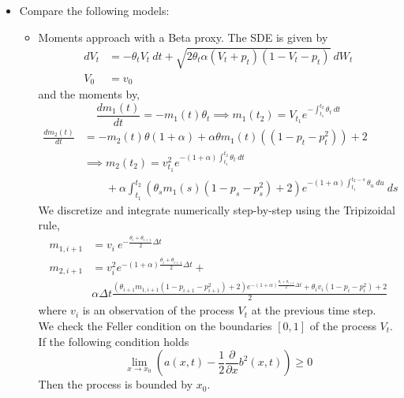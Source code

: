 \documentclass[a4paper, 12pt]{article}
\begin{document}
\begin{itemize}
\item Compare the following models:
	\begin{itemize}
		\item Moments approach with a Beta proxy. The SDE is given by
		\begin{equation}
		\begin{split}
		dV_t &=  - \theta_t V_t \  dt + \sqrt{2 \theta_t \alpha (V_t +p_t ) (1-V_t-p_t)} \  dW_t  \\ %
		V_0 & = v_0
	\end{split}\label{VtSDE}
	\end{equation}
		and the moments by,
		\begin{equation*}
		\frac{d m_1 (t)}{dt} = - m_1(t)\theta_t \implies m_1(t_2)= V_{t_1} e^{-\int_{t_1}^{t_2} \theta_t \ dt }
		\end{equation*}
		\begin{equation*}
		\begin{split}
		\frac{d m_2 (t)}{dt} &=  - m_2(t)\theta(1+\alpha) + \alpha\theta m_1(t)( (1-p_t -p_t^2)) +2 \\
		& \implies m_2(t_2) = v_{t_1}^2 e^{-(1+\alpha)\int_{t_1}^{t_2} \theta_t \ dt} \\
		& \quad \quad + \alpha \int_{t_1}^{t_2} \left(\theta_s m_1(s)( 1-p_s - p_s^2 )+2\right)   e^{-(1+\alpha)\int_{t_1}^{t_2-s} \theta_u \ du}  \ ds
		\end{split}
		\end{equation*}
		We discretize and integrate numerically step-by-step using the Tripizoidal rule,
		\begin{align*}
			m_{1,i+1}&= v_i \ e^{ - \frac{\theta_i + \theta_{i+1}}{2} \Delta t} \\
			m_{2,i+1} &= v_i^2 e^{-(1+ \alpha)\frac{\theta_i + \theta_{i+1}}{2} \Delta t } + \\
			& \alpha \Delta t  \frac{ \left( \theta_{i+1}m_{1,i+1}(1-p_{i+1} - p_{i+1}^2)+2 \right)e^{-(1+\alpha) \frac{\theta_i + \theta_{i+1}}{2} \Delta t }  + \theta_{i}v_{i}(1-p_{i} - p_{i}^2) +2    }{2}
	\end{align*}
	where $v_i$ is an observation of the process $V_t$ at the previous time step.\\
	We check the Feller condition on the boundaries $[0,1]$ of the process $V_t$. If the following condition holds
	\begin{equation*}
		\lim_{x\to x_{0}} \left( a(x,t)  - \frac{1}{2}\frac{\partial}{\partial x} b^2(x,t) \right) \geq 0
\end{equation*}
Then the process is bounded by $x_0$.

\end{itemize}
\end{itemize}
\end{document}
